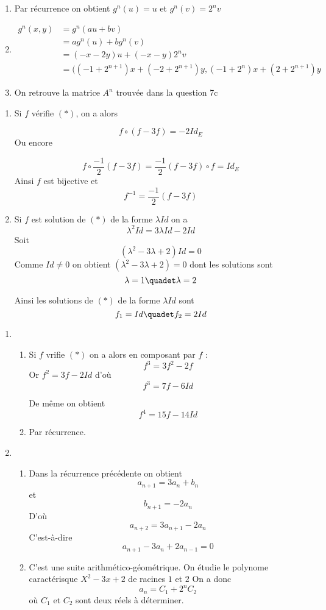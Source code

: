 \documentclass[a4paper, 11pt,reqno]{article}
\begin{document}
\begin{correction}
\begin{enumerate}
\begin{enumerate}
\item Par récurrence on obtient $g^n(u)=u$ et $g^n (v)=2^n v$
\item 
\begin{align*}
g^n(x,y)& = g^n(au+bv)\\
				&= ag^n(u) +bg^n(v)\\
				&= (-x-2y)u +(-x-y) 2^n v\\
				&= ((-1+2^{n+1})x + (-2+2^{n+1})y , (-1+2^{n})x + (2+2^{n+1})y 
\end{align*}

\item On retrouve la matrice $A^n$ trouvée dans la question 7c




\end{enumerate}


\end{enumerate}

\begin{enumerate}
\item Si $f$ vérifie $(*)$, on a alors 

$$f\circ (f -3f) = -2Id_E$$
Ou encore 

$$f\circ \frac{-1}{2}(f -3f) =\frac{-1}{2}(f -3f)  \circ f = Id_E$$
Ainsi $f$ est bijective et $$f^{-1} =\frac{-1}{2}(f -3f) $$
\item Si $f$ est solution de $(*)$ de la forme $\lambda Id$ on a 
$$\lambda ^2 Id = 3\lambda Id -2 Id$$
Soit $$(\lambda^2 -3\lambda +2)Id =0$$
Comme $Id\neq 0$ on obtient $(\lambda^2 -3\lambda +2)=0$ dont les solutions sont $$\lambda =1 \quadet \lambda = 2$$

Ainsi les solutions de $(*)$ de la forme $\lambda Id$ sont $$f_1 = Id \quadet f_2 =2 Id$$
 \end{enumerate}
 
 \begin{enumerate}
 \item \begin{enumerate}
 \item Si $f$ vrifie $(*)$ on a alors en composant par $f$ : $$f^3= 3f^2-2f$$
 Or $f^2 =3f-2Id$ d'où
 $$f^3 = 7f -6Id$$
 
 De même on obtient $$f^4 =15f -14Id$$
 
 \item Par récurrence. 
 

 \end{enumerate}
 \item \begin{enumerate}
 \item Dans la récurrence précédente on obtient 
 $$a_{n+1}  = 3a_n+b_n$$
 et 
 $$b_{n+1} = -2a_n$$
 D'où 
 $$a_{n+2} =3a_{n+1} -2a_n$$
 C'est-à-dire 
 $$a_{n+1}-3a_n +2a_{n-1}=0$$
 \item 
C'est une suite arithmético-géométrique. On étudie le polynome caractérisque $X^2-3x+2$ de racines 
$1$ et $2$
On a donc 
$$a_n =C_1 +2^n C_2$$
où $C_1$ et $C_2$ sont deux réels à déterminer. 


\end{enumerate}
\end{enumerate}
\end{correction}
\end{document}
